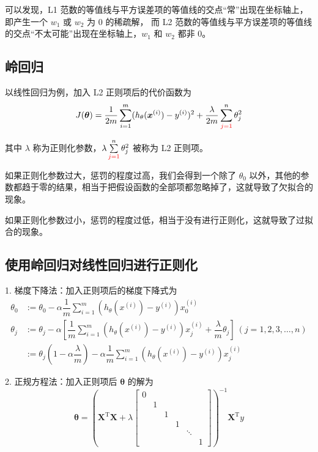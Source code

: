 可以发现，L1 范数的等值线与平方误差项的等值线的交点“常”出现在坐标轴上，即产生一个 $w_1$ 或 $w_2$ 为 0 的稀疏解，
而 L2 范数的等值线与平方误差项的等值线的交点“不太可能”出现在坐标轴上，$w_1$ 和 $w_2$ 都非 0。

\subsection{岭回归}

以线性回归为例，加入 L2 正则项后的代价函数为
\begin{equation}
    J(\boldsymbol{\theta}) = \dfrac{1}{2m}\sum_{i=1}^m(h_\theta(\boldsymbol{x}^{(i)}) - y^{(i)})^2 + \dfrac{\lambda}{2m}\sum_{\textcolor{red}{j=1}}^n\theta_j^2
\end{equation}

其中 $\lambda$ 称为正则化参数，$\lambda\sum\limits_{\textcolor{red}{j=1}}^n\theta_j^2$ 被称为 L2 正则项。

如果正则化参数过大，惩罚的程度过高，我们会得到一个除了 $\theta_0$ 以外，其他的参数都趋于零的结果，相当于把假设函数的全部项都忽略掉了，这就导致了欠拟合的现象。

如果正则化参数过小，惩罚的程度过低，相当于没有进行正则化，这就导致了过拟合的现象。

\subsection{使用岭回归对线性回归进行正则化}
1. 梯度下降法：加入正则项后的梯度下降式为
\begin{equation}
    \begin{aligned}
        \theta_0 &:= \theta_0 - \alpha \dfrac 1m \sum\limits_{i = 1}^m {\left(h_\theta(x^{(i)}) - y^{(i)}\right)}x_0^{(i)} \\
        \theta_j &:= \theta_j - \alpha \left[\dfrac 1m \sum\limits_{i = 1}^m {\left(h_\theta(x^{(i)}) - y^{(i)}\right)}x_j^{(i)} + \dfrac{\lambda}{m}\theta_j\right]\ (j = 1, 2, 3, \dots, n) \\
        &:=\theta_{j}\left(1-\alpha \dfrac{\lambda}{m}\right)-\alpha \dfrac{1}{m} \sum_{i=1}^{m}\left(h_{\theta}\left(x^{(i)}\right)-y^{(i)}\right) x_{j}^{(i)}
    \end{aligned}
\end{equation}

2. 正规方程法：加入正则项后 $\boldsymbol{\theta}$ 的解为
\begin{equation}
    \boldsymbol\theta = \left(\mathbf{X}^{\mathrm{T}}\mathbf{X} + \lambda \begin{bmatrix}0 & & & & & \\ & 1 & & & & 
        \\ & & 1 & & & \\ & & & 1 & & \\& & & & \ddots & 
        \\ & & & & & 1\end{bmatrix}\right)^{-1}\mathbf{X}^{\mathrm{T}}y
\end{equation}

